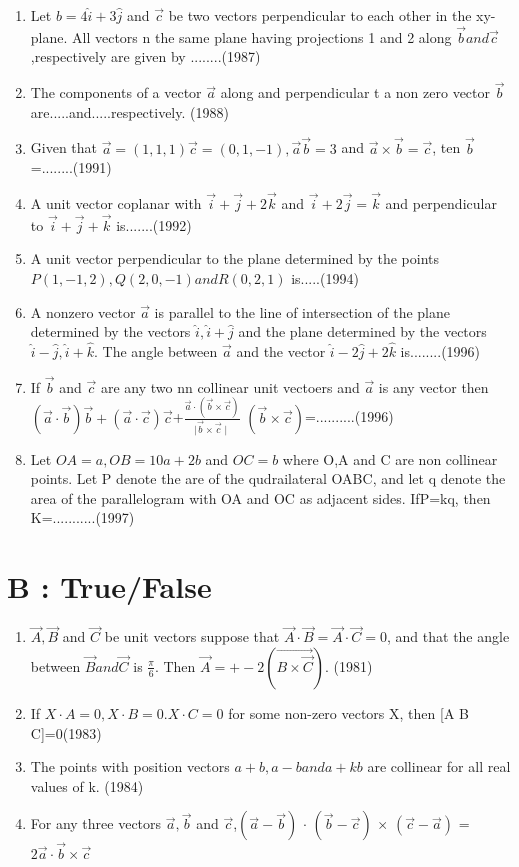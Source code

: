 \documentclass[12pt]{article}
\providecommand{\brak}[1]{\ensuremath{\left(#1\right)}}
\begin{document}
\begin{enumerate}
\item Let $b=4\hat{i}+3\hat{j}$ and $\vec{c}$ be two vectors perpendicular to each other in the xy-plane. All vectors n the same plane having projections 1 and 2 along $\vec{b} and \vec{c}$,respectively are given by ........(1987)
\item The components of a vector $\vec{a}$ along and perpendicular t a non zero vector $\vec{b}$ are.....and.....respectively.  (1988)
\item Given that $\vec{a}=(1,1,1)\vec{c}=(0,1,-1),\vec{a}\vec{b}=3$ and $\vec{a}\times\vec{b}=\vec{c}$, ten $\vec{b}$=........(1991)
\item A unit vector coplanar with $\vec{i}+\vec{j}+2\vec{k}$ and $\vec{i}+2\vec{j}=\vec{k}$ and perpendicular to $\vec{i}+\vec{j}+\vec{k}$ is.......(1992)
\item A unit vector perpendicular to the plane determined by the points $P(1,-1,2),Q(2,0,-1) and R(0,2,1)$ is.....(1994) 
\item A nonzero vector $\vec{a}$ is parallel to the line of intersection of the plane determined by the vectors $\hat{i},\hat{i}+\hat{j}$ and the plane determined by the vectors $\hat{i}-\hat{j},\hat{i}+\hat{k}$. The angle between $\vec{a}$ and the vector $\hat{i}-2\hat{j}+2\hat{k}$  is........(1996)
\item If $\vec{b}$ and $\vec{c}$ are any two nn collinear unit vectoers and $\vec{a}$ is any vector then $\brak{\vec{a}\cdot\vec{b}}\vec{b}+\brak{\vec{a}\cdot\vec{c}}\vec{c}$+$\frac{\vec{a}\cdot \brak{\vec{b}\times\vec{c}}}{\mid\vec{b}\times\vec{c}\mid}$ $\brak{\vec{b}\times \vec{c}}$=..........(1996)
\item Let $OA=a, OB=10a+2b$ and $OC=b$ where O,A and C are non collinear points. Let P denote the are of the qudrailateral OABC, and let q denote the area of the parallelogram  with OA and OC as adjacent sides. IfP=kq, then K=...........(1997) 
\end{enumerate}

\section*{B    :    True/False}

\begin{enumerate}
\item $\vec{A},\vec{B}$ and $\vec{C}$  be unit vectors suppose that $\vec{A}\cdot\vec{B}=\vec{A}\cdot\vec{C}=0$, and that the angle between $\vec{B} and \vec{C}$ is $\frac{\pi}{6}$. Then $\vec{A}=+-2\brak{\vec{B\times\vec{C}}}$.    (1981)
\item If $X\cdot A=0,X\cdot B=0. X\cdot C=0$ for some non-zero vectors X, then [A B C]=0(1983)
\item The points with position vectors $a+b,a-b and a+kb$ are collinear for all real values of k.   (1984)
\item For any three vectors $\vec{a},\vec{b}$ and $\vec{c}$,$\brak{\vec{a}-\vec{b}}$
$\cdot$ $\brak{\vec{b}-\vec{c}}$ $\times$ $\brak{\vec{c}-\vec{a}}$ =$2\vec{a}\cdot\vec{b}\times\vec{c}$
\end{enumerate}
\end{document}
